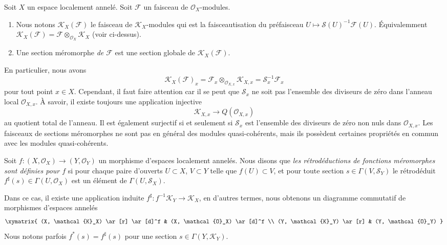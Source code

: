 \begin{definition}
\label{definition-meromorphic-section}
Soit  $X$  un espace localement annelé. Soit  $\mathcal{F}$  un faisceau de
 $\mathcal{O}_X$-modules.
\begin{enumerate}
\item Nous notons  $\mathcal{K}_X(\mathcal{F})$  le faisceau de  $\mathcal{K}_X$-modules qui est la
faisceautisation du préfaisceau  $U \mapsto \mathcal{S}(U)^{-1}\mathcal{F}(U)$. Équivalemment  $\mathcal{K}_X(\mathcal{F}) =
\mathcal{F} \otimes_{\mathcal{O}_X} \mathcal{K}_X$  (voir
ci-dessus).
\item Une section méromorphe  {\it  de  $\mathcal{F}$}  est
une section globale de  $\mathcal{K}_X(\mathcal{F})$.
\end{enumerate}
\end{definition}

\noindent
En particulier, nous avons
$$
\mathcal{K}_X(\mathcal{F})_x
=
\mathcal{F}_x \otimes_{\mathcal{O}_{X, x}} \mathcal{K}_{X, x}
=
\mathcal{S}_x^{-1}\mathcal{F}_x
$$
pour tout point  $x \in X$. Cependant, il faut faire attention car il se peut
que  $\mathcal{S}_x$  ne soit pas l'ensemble des diviseurs de zéro dans l'anneau local
 $\mathcal{O}_{X, x}$. À savoir, il existe toujours une application injective
$$
\mathcal{K}_{X, x} \longrightarrow Q(\mathcal{O}_{X, x})
$$
au quotient total de l'anneau. Il est également surjectif si et seulement si
 $\mathcal{S}_x$  est l'ensemble des diviseurs de zéro non nuls dans  $\mathcal{O}_{X, x}$. Les
faisceaux de sections méromorphes ne sont pas en général des modules
quasi-cohérents, mais ils possèdent certaines propriétés en commun avec les
modules quasi-cohérents.

\begin{definition}
\label{definition-pullback-meromorphic-sections}
Soit  $f : (X, \mathcal{O}_X) \to (Y, \mathcal{O}_Y)$  un morphisme d'espaces localement annelés. Nous disons que
 {\it  les rétrodéductions de fonctions méromorphes sont
définies pour  $f$}  si pour chaque paire d'ouverts
 $U \subset X$,  $V \subset Y$  telle que  $f(U) \subset V$, et pour toute section
 $s \in \Gamma(V, \mathcal{S}_Y)$  le rétrodéduit  $f^\sharp(s) \in \Gamma(U, \mathcal{O}_X)$  est un élément de  $\Gamma(U, \mathcal{S}_X)$.
\end{definition}

\noindent
Dans ce cas, il existe une application induite  $f^\sharp : f^{-1}\mathcal{K}_Y \to \mathcal{K}_X$, en d'autres termes,
nous obtenons un diagramme commutatif de morphismes d'espaces annelés
$$
\xymatrix{
(X, \mathcal{K}_X) \ar[r] \ar[d]^f &
(X, \mathcal{O}_X) \ar[d]^f \\
(Y, \mathcal{K}_Y) \ar[r] &
(Y, \mathcal{O}_Y)
}
$$
Nous notons parfois  $f^*(s) = f^\sharp(s)$  pour une section  $s \in \Gamma(Y, \mathcal{K}_Y)$.

